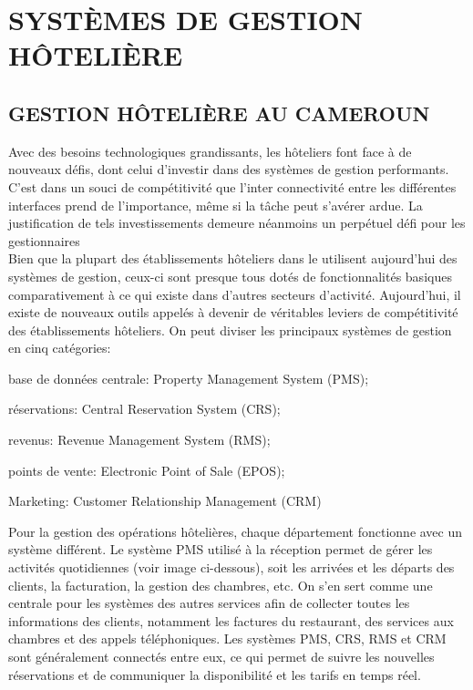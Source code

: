 \chapter{SYSTÈMES DE GESTION HÔTELIÈRE}
\section{GESTION HÔTELIÈRE AU CAMEROUN}

Avec des besoins technologiques grandissants, les hôteliers font face à de nouveaux défis, dont celui d’investir dans des systèmes de gestion performants. C’est dans un souci de compétitivité que l’inter connectivité entre les différentes interfaces prend de l’importance, même si la tâche peut s’avérer ardue. La justification de tels investissements demeure néanmoins un perpétuel défi pour les gestionnaires\\

Bien que la plupart des établissements hôteliers dans le utilisent aujourd’hui des systèmes de gestion, ceux-ci sont presque tous dotés de fonctionnalités basiques comparativement à ce qui existe dans d’autres secteurs d’activité. Aujourd'hui, il existe de nouveaux outils appelés à devenir de véritables leviers de compétitivité des établissements hôteliers. On peut diviser les principaux systèmes de gestion en cinq catégories:
\begin{list}{•}{ }
\item base de données centrale: Property Management System (PMS);
\item réservations: Central Reservation System (CRS);
\item revenus: Revenue Management System (RMS);
\item points de vente: Electronic Point of Sale (EPOS);
\item Marketing: Customer Relationship Management (CRM)\\
\end{list}

Pour la gestion des opérations hôtelières, chaque département fonctionne avec un système différent. Le système PMS utilisé à la réception permet de gérer les activités quotidiennes (voir image ci-dessous), soit les arrivées et les départs des clients, la facturation, la gestion des chambres, etc. On s’en sert comme une centrale pour les systèmes des autres services afin de collecter toutes les informations des clients, notamment les factures du restaurant, des services aux chambres et des appels téléphoniques. Les systèmes PMS, CRS, RMS et CRM sont généralement connectés entre eux, ce qui permet de suivre les nouvelles réservations et de communiquer la disponibilité et les tarifs en temps réel.\\

